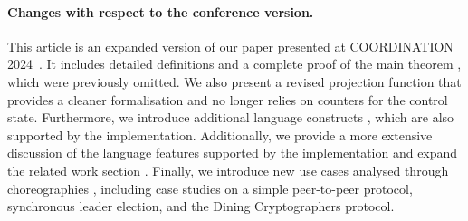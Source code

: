 \paragraph{Changes with respect to the conference version.}
%
%
This article is an expanded version of our paper presented at
COORDINATION 2024~\cite{CV24}. It includes detailed definitions and a
complete proof of the main theorem ,
which were previously omitted. We also present a revised projection
function  that provides a cleaner
formalisation and no longer relies on counters for the control state.
Furthermore, we introduce additional language constructs
, which are also supported by
the implementation. Additionally, we provide a more extensive discussion
of the language features supported by the implementation and expand
the related work section . Finally,
we introduce new use cases analysed through choreographies
, including case studies on a simple
peer-to-peer protocol, synchronous leader election, and the Dining
Cryptographers protocol.

